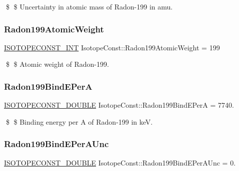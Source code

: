 \$ \$ Uncertainty in atomic mass of Radon-\/199 in amu. \mbox{\label{group___isotope_const-_radon-_rn199_ga90b0228356dc095f0158edbf4f133246}} 
\subsubsection{\texorpdfstring{Radon199\+Atomic\+Weight}{Radon199AtomicWeight}}
{\footnotesize\ttfamily \mbox{\hyperlink{group___isotope_const-_macros_ga5f18360b3e99483a35c32d789e62621c}{I\+S\+O\+T\+O\+P\+E\+C\+O\+N\+S\+T\+\_\+\+I\+NT}} Isotope\+Const\+::\+Radon199\+Atomic\+Weight = 199}

\$ \$ Atomic weight of Radon-\/199. \mbox{\label{group___isotope_const-_radon-_rn199_gae1710db47758b831a99d92144fb6d51d}} 
\subsubsection{\texorpdfstring{Radon199\+Bind\+E\+PerA}{Radon199BindEPerA}}
{\footnotesize\ttfamily \mbox{\hyperlink{group___isotope_const-_macros_ga8f45a7272ce02c0b4c65c44636ed719a}{I\+S\+O\+T\+O\+P\+E\+C\+O\+N\+S\+T\+\_\+\+D\+O\+U\+B\+LE}} Isotope\+Const\+::\+Radon199\+Bind\+E\+PerA = 7740.}

\$ \$ Binding energy per A of Radon-\/199 in keV. \mbox{\label{group___isotope_const-_radon-_rn199_ga7e0f948b0b04b9ac325b3936807897ae}} 
\subsubsection{\texorpdfstring{Radon199\+Bind\+E\+Per\+A\+Unc}{Radon199BindEPerAUnc}}
{\footnotesize\ttfamily \mbox{\hyperlink{group___isotope_const-_macros_ga8f45a7272ce02c0b4c65c44636ed719a}{I\+S\+O\+T\+O\+P\+E\+C\+O\+N\+S\+T\+\_\+\+D\+O\+U\+B\+LE}} Isotope\+Const\+::\+Radon199\+Bind\+E\+Per\+A\+Unc = 0.}

